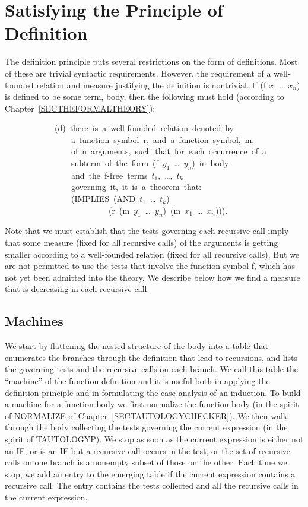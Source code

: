 \documentclass[11pt]{book}
\newenvironment{pubasis}{\begin{flushleft}\ttfamily\small}{\normalsize\rmfamily\end{flushleft}}
\newcommand{\pubdefaulttextsize}{\large}
\begin{document}
\section{Satisfying the Principle of Definition}
\pubdefaulttextsize
The definition principle puts several restrictions on the form of
definitions.  Most of these are trivial syntactic requirements.  However, the
requirement of a well-founded relation and measure justifying the definition
is nontrivial.  If (f $x_{1}$ \ldots{} $x_{n}$) is
defined to be some term, body, then the following must hold (according
to Chapter~\ref{SECTHEFORMALTHEORY}):
\begin{pubasis}
~~~~~~~~~~~~(d)~there~is~a~well-founded~relation~denoted~by\\
~~~~~~~~~~~~~~~~a~function~symbol~r,~and~a~function~symbol,~m,\\
~~~~~~~~~~~~~~~~of~n~arguments,~such~that~for~each~occurrence~of~a\\
~~~~~~~~~~~~~~~~subterm~of~the~form~(f~$y_{1}$~\ldots{}~$y_{n}$)~in~body\\
~~~~~~~~~~~~~~~~and~the~f-free~terms~$t_{1}$,~\ldots{},~$t_{k}$\\
~~~~~~~~~~~~~~~~governing~it,~it~is~a~theorem~that:\\

~~~~~~~~~~~~~~~~(IMPLIES~(AND~$t_{1}$~\ldots{}~$t_{k}$)\\
~~~~~~~~~~~~~~~~~~~~~~~~~(r~(m~$y_{1}$~\ldots{}~$y_{n}$)~(m~$x_{1}$~\ldots{}~$x_{n}$))).\\
\end{pubasis}
Note that we must establish that the tests governing each recursive
call imply that some measure (fixed for all recursive calls) of the
arguments is getting smaller according to a well-founded relation
(fixed for all recursive calls).  But we are not permitted to use the tests
that involve the function symbol f, which has not yet been admitted into
the theory.  We describe below how we find a measure that is decreasing
in each recursive call.
\subsection{Machines}
\pubdefaulttextsize
We start by flattening the
nested structure of the body into a table that enumerates the branches through the
definition that lead to recursions, and lists the  governing tests and the recursive calls on
each branch.
We call this table the ``machine'' of the function definition and it is useful both in
applying the definition principle and in formulating the case analysis of an induction.
To build a machine for a function body we first normalize the function
body (in the spirit of NORMALIZE of Chapter~\ref{SECTAUTOLOGYCHECKER}).  We then walk through the body collecting
the tests governing the current expression (in the spirit of TAUTOLOGYP).  We
stop as soon as the current expression
is
either not an IF, or is an IF but a recursive call occurs in the test, or
the set of recursive calls on one branch is a nonempty subset of
those on the other.  Each time we stop, we add an entry to the emerging table
if the current expression contains a recursive call.  The entry
contains the tests collected and all the recursive
calls in the current expression.
\end{document}
